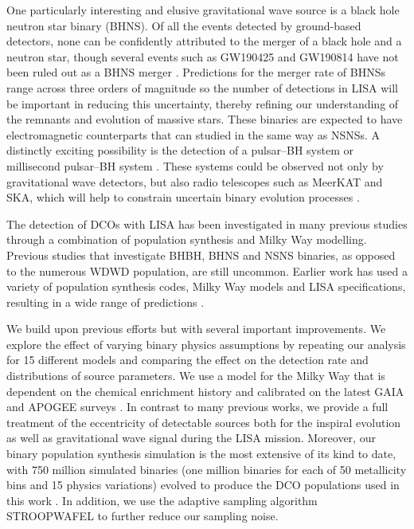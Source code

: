 One particularly interesting and elusive gravitational wave source is a black hole neutron star binary (BHNS). Of all the events detected by ground-based detectors, none can be confidently attributed to the merger of a black hole and a neutron star, though several events such as GW190425 and GW190814 have not been ruled out as a BHNS merger \citep{Abbott+2020_GW190425,Abbott+2020_GW190814}. Predictions for the merger rate of BHNSs range across three orders of magnitude \citep[e.g.][]{Abadie+2010, Broekgaarden+2021} so the number of detections in LISA will be important in reducing this uncertainty, thereby refining our understanding of the remnants and evolution of massive stars. These binaries are expected to have electromagnetic counterparts that can studied in the same way as NSNSs. A distinctly exciting possibility is the detection of a pulsar--BH system or millisecond pulsar--BH system \citep{Narayan+1991}. These systems could be observed not only by gravitational wave detectors, but also radio telescopes such as MeerKAT and SKA, which will help to constrain uncertain binary evolution processes \citep[e.g.][]{Pfahl+2005,Chattopadhyay+2020}.

The detection of DCOs with LISA has been investigated in many previous studies through a combination of population synthesis and Milky Way modelling. Previous studies that investigate BHBH, BHNS and NSNS binaries, as opposed to the numerous WDWD population, are still uncommon. Earlier work has used a variety of population synthesis codes, Milky Way models and LISA specifications, resulting in a wide range of predictions \citep{Nelemans+2001,Liu+2009,Belczynski+2010,Liu+2014,Lamberts+2019,Lau+2020,Breivik+2020,Sesana+2020}.

We build upon previous efforts but with several important improvements. We explore the effect of varying binary physics assumptions by repeating our analysis for 15 different models and comparing the effect on the detection rate and distributions of source parameters. We use a model for the Milky Way that is dependent on the chemical enrichment history and calibrated on the latest GAIA and APOGEE surveys \citep{GaiaCollaboration+2016,Majewski+2017,Frankel+2018}. In contrast to many previous works, we provide a full treatment of the eccentricity of detectable sources both for the inspiral evolution as well as gravitational wave signal during the LISA mission. Moreover, our binary population synthesis simulation is the most extensive of its kind to date, with 750 million simulated binaries (one million binaries for each of 50 metallicity bins and 15 physics variations) evolved to produce the DCO populations used in this work \citep{Broekgaarden+2021}. In addition, we use the adaptive sampling algorithm STROOPWAFEL \citep{Broekgaarden+2019} to further reduce our sampling noise.

